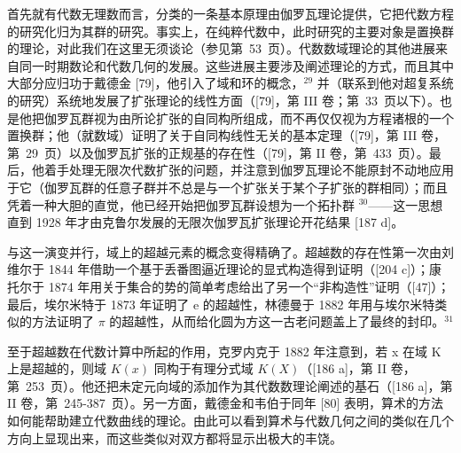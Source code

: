 首先就有代数无理数而言，分类的一条基本原理由伽罗瓦理论提供，它把代数方程的研究化归为其群的研究。事实上，在纯粹代数中，此时研究的主要对象是置换群的理论，对此我们在这里无须谈论（参见第~53~页）。代数数域理论的其他进展来自同一时期数论和代数几何的发展。这些进展主要涉及阐述理论的方式，而且其中大部分应归功于戴德金 {[}79{]}，他引入了域和环的概念，\(^{29}\) 并（联系到他对超复系统的研究）系统地发展了扩张理论的线性方面（{[}79{]}，第 III 卷；第~33~页以下）。也是他把伽罗瓦群视为由所论扩张的自同构所组成，而不再仅仅视为方程诸根的一个置换群；他（就数域）证明了关于自同构线性无关的基本定理（{[}79{]}，第 III 卷，第~29~页）以及伽罗瓦扩张的正规基的存在性（{[}79{]}，第 II 卷，第~433~页）。最后，他着手处理无限次代数扩张的问题，并注意到伽罗瓦理论不能原封不动地应用于它（伽罗瓦群的任意子群并不总是与一个扩张关于某个子扩张的群相同）；而且凭着一种大胆的直觉，他已经开始把伽罗瓦群设想为一个拓扑群 \(^{30}\)——这一思想直到 1928 年才由克鲁尔发展的无限次伽罗瓦扩张理论开花结果 {[}187 d{]}。

与这一演变并行，域上的超越元素的概念变得精确了。超越数的存在性第一次由刘维尔于 1844 年借助一个基于丢番图逼近理论的显式构造得到证明（{[}204 c{]}）；康托尔于 1874 年用关于集合的势的简单考虑给出了另一个“非构造性”证明（{[}47{]}）；最后，埃尔米特于 1873 年证明了 e 的超越性，林德曼于 1882 年用与埃尔米特类似的方法证明了 \(\pi\) 的超越性，从而给化圆为方这一古老问题盖上了最终的封印。\(^{31}\)

至于超越数在代数计算中所起的作用，克罗内克于 1882 年注意到，若 x 在域 K 上是超越的，则域 \(K(x)\) 同构于有理分式域 \(K(X)\)（{[}186 a{]}，第 II 卷，第~253~页）。他还把未定元向域的添加作为其代数数理论阐述的基石（{[}186 a{]}，第 II 卷，第~245-387~页）。另一方面，戴德金和韦伯于同年 {[}80{]} 表明，算术的方法如何能帮助建立代数曲线的理论。由此可以看到算术与代数几何之间的类似在几个方向上显现出来，而这些类似对双方都将显示出极大的丰饶。

